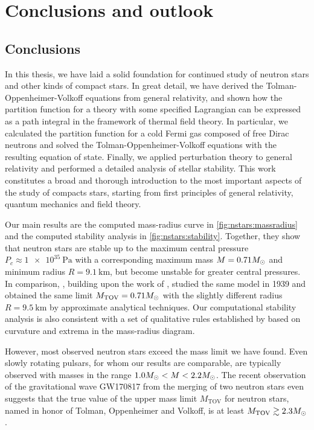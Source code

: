 \chapter{Conclusions and outlook}
\label{chap:conclusion}

\section{Conclusions}

In this thesis, we have laid a solid foundation for continued study of neutron stars and other kinds of compact stars.
In great detail, we have derived the Tolman-Oppenheimer-Volkoff equations from general relativity, and shown how the partition function for a theory with some specified Lagrangian can be expressed as a path integral in the framework of thermal field theory.
In particular, we calculated the partition function for a cold Fermi gas composed of free Dirac neutrons and solved the Tolman-Oppenheimer-Volkoff equations with the resulting equation of state.
Finally, we applied perturbation theory to general relativity and performed a detailed analysis of stellar stability.
This work constitutes a broad and thorough introduction to the most important aspects of the study of compacts stars, starting from first principles of general relativity, quantum mechanics and field theory.

Our main results are the computed mass-radius curve in \cref{fig:nstars:massradius} and the computed stability analysis in \cref{fig:nstars:stability}.
Together, they show that neutron stars are stable up to the maximum central pressure $P_c \approx \SI{1e35}{\pascal} $ with a corresponding maximum mass $M = 0.71 M_\odot$ and minimum radius $R = \SI{9.1}{\kilo\meter}$, but become unstable for greater central pressures.
In comparison, \cite{ref:tov}, building upon the work of \cite{ref:tolman}, studied the same model in 1939 and obtained the same limit $M_\text{TOV} = 0.71 M_\odot$ with the slightly different radius $R = \SI{9.5}{\kilo\meter}$ by approximate analytical techniques.
Our computational stability analysis is also consistent with a set of qualitative rules established by \cite{ref:stability_methods} based on curvature and extrema in the mass-radius diagram.

However, most observed neutron stars exceed the mass limit we have found.
Even slowly rotating pulsars, for whom our results are comparable, \cite[section 2.1]{ref:neutron_star_physics} are typically observed with masses in the range $1.0 M_\odot < M < 2.2 M_\odot$. \cite[figure 2 and 3]{ref:neutron_star_masses_paper}
The recent observation of the gravitational wave GW170817 from the merging of two neutron stars even suggests that the true value of the upper mass limit $M_\text{TOV}$ for neutron stars, named in honor of Tolman, Oppenheimer and Volkoff, is at least $M_\text{TOV} \gtrsim 2.3 M_\odot$. \cite{ref:gravitational_wave_tov_limit}

